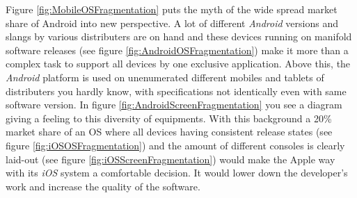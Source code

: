 Figure \vref{fig:MobileOSFragmentation} puts the myth of the wide spread market share of Android into new perspective. A lot of different \emph{Android} versions and slangs by various distributers are on hand and these devices running on manifold software releases (see figure \vref{fig:AndroidOSFragmentation}) make it more than a complex task to support all devices by one exclusive application. Above this, the \emph{Android} platform is used on unenumerated different mobiles and tablets of distributers you hardly know, with specifications not identically even with same software version. In figure \vref{fig:AndroidScreenFragmentation} you see a diagram giving a feeling to this diversity of equipments. With this background a 20\% market share of an \gls{OS} where all devices having consistent release states (see figure \vref{fig:iOSOSFragmentation}) and the amount of different consoles is clearly laid-out (see figure \vref{fig:iOSScreenFragmentation}) would make the Apple way with its \emph{iOS} system a comfortable decision. It would lower down the developer's work and increase the quality of the software.

